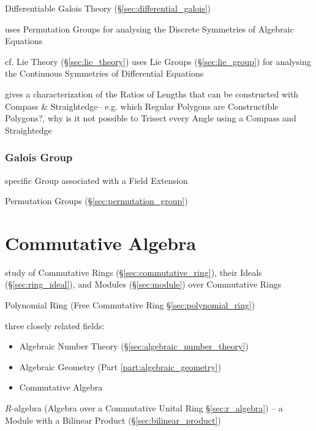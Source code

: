 Differentiable Galois Theory (\S\ref{sec:differential_galois})

uses Permutation Groups for analysing the Discrete Symmetries of
Algebraic Equations %

cf. Lie Theory (\S\ref{sec:lie_theory}) uses Lie Groups
(\S\ref{sec:lie_group}) for analysing the Continuous Symmetries of
Differential Equations

gives a characterization of the Ratios of Lengths that can be constructed with
Compass \& Straightedge-- e.g. which Regular Polygons are Constructible
Polygons?, why is it not possible to Trisect every Angle using a Compass and
Straightedge



\subsubsection{Galois Group}\label{sec:galois_group}

specific Group associated with a Field Extension %

Permutation Groups (\S\ref{sec:permutation_group})



\section{Commutative Algebra}\label{sec:commutative_algebra}

study of Commutative Rings (\S\ref{sec:commutative_ring}), their Ideals
(\S\ref{sec:ring_ideal}), and Modules (\S\ref{sec:module}) over Commutative
Rings

Polynomial Ring (Free Commutative Ring \S\ref{sec:polynomial_ring})

three closely related fields:
\begin{itemize}
  \item Algebraic Number Theory (\S\ref{sec:algebraic_number_theory})
  \item Algebraic Geometry (Part \ref{part:algebraic_geometry})
  \item Commutative Algebra
\end{itemize}

\fist $R$-algebra (Algebra over a Commutative Unital Ring \S\ref{sec:r_algebra})
-- a Module with a Bilinear Product (\S\ref{sec:bilinear_product})

